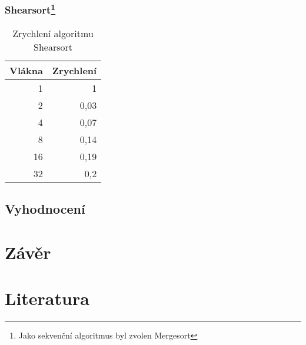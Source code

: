 \documentclass[12pt]{article}
\begin{document}
\subsubsection{Shearsort\footnote{Jako sekvenční algoritmus byl zvolen Mergesort}}
\begin{table}[H]
\begin{center}
\begin{tabular}{|r|r|}
\hline Vlákna & Zrychlení \\ \hline
1  & 1  \\ \hline
2  & 0,03  \\ \hline
4  & 0,07  \\ \hline
8  & 0,14  \\ \hline
16 & 0,19  \\ \hline
32 & 0,2  \\ \hline
\end{tabular} 
\end{center}
\caption{Zrychlení algoritmu Shearsort}
\end{table}



\subsection{Vyhodnocení}

\section{Závěr}

\section{Literatura}


\appendix
\end{document}
